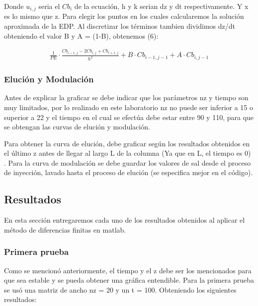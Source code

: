 \par Donde $u_{i,j}$ seria el $Cb_{i}$ de la ecuación, h y k serian dz y dt respectivamente. Y x es lo mismo que z. Para elegir los puntos en los cuales calcularemos la solución aproximada de la EDP. Al discretizar los términos tambien dividimos dz/dt obteniendo el valor B y A = (1-B), obtenemos (6):

\begin{equation}
\begin{split}
    \frac{1}{PE}\cdot\frac{Cb_{i-1,j}-2Cb_{i,j}+Cb_{i+1,j}}{h^2} + B\cdot Cb_{i-1,j-1} + A\cdot Cb_{i,j-1}
\end{split}
\end{equation}


\subsubsection{Elución y Modulación}

\par Antes de explicar la graficar se debe indicar que los parámetros nz y tiempo son muy limitados, por lo realizado en este laboratorio nz no puede ser inferior a 15 o superior a 22 y el tiempo en el cual se efectúa debe estar entre 90 y 110, para que se obtengan las curvas de elución y modulación. 

\par Para obtener la curva de elución, debe graficar según los resultados obtenidos en el último z antes de llegar al largo L de la columna (Ya que en L, el tiempo es 0) . Para la curva de modulación se debe guardar los valores de sal desde el proceso de inyección, lavado hasta el proceso de elución (se especifica mejor en el código).

\subsection{Resultados}

\par En esta sección entregaremos cada uno de los resultados obtenidos al aplicar el método de diferencias finitas en matlab.

\subsubsection{Primera prueba}

\par Como se mencionó anteriormente, el tiempo y el z debe ser los mencionados para que sea estable y se pueda obtener una gráfica entendible. Para la primera prueba se usó una matriz de ancho nz = 20 y un t = 100. Obteniendo los siguientes resultados:

